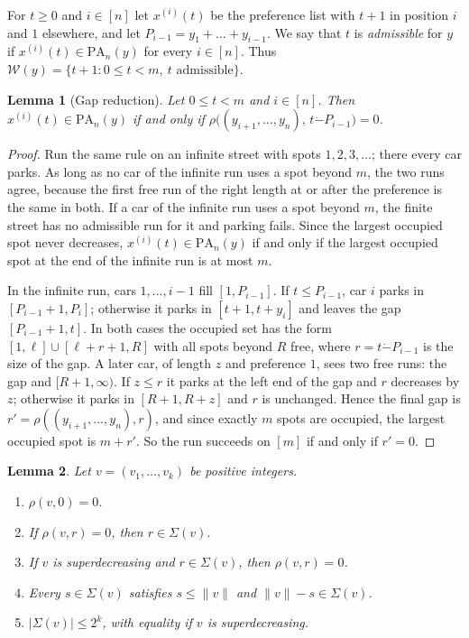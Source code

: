 \documentclass[11pt]{article}
\newtheorem{lemma}{Lemma}
\theoremstyle{remark}
\newcommand{\W}{\mathcal W}
\newcommand{\PA}{\mathrm{PA}}
\newcommand{\Sub}{\Sigma}
\newcommand{\monus}{\mathbin{\dot{-}}}
\begin{document}
For $t\ge0$ and $i\in[n]$ let $x^{(i)}(t)$ be the preference list with $t+1$
in position $i$ and $1$ elsewhere, and let $P_{i-1}=y_1+\dots+y_{i-1}$. We say
that $t$ is \emph{admissible} for $y$ if $x^{(i)}(t)\in\PA_n(y)$ for every
$i\in[n]$. Thus $\W(y)=\{t+1: 0\le t<m,\ t \text{ admissible}\}$.

\begin{lemma}[Gap reduction]\label{lem:gap}
Let $0\le t<m$ and $i\in[n]$. Then $x^{(i)}(t)\in\PA_n(y)$ if and only if
$\rho\bigl((y_{i+1},\dots,y_n),\,t\monus P_{i-1}\bigr)=0$.
\end{lemma}

\begin{proof}
Run the same rule on an infinite street with spots $1,2,3,\dots$; there every
car parks. As long as no car of the infinite run uses a spot beyond $m$, the
two runs agree, because the first free run of the right length at or after the
preference is the same in both. If a car of the infinite run uses a spot
beyond $m$, the finite street has no admissible run for it and parking fails.
Since the largest occupied spot never decreases, $x^{(i)}(t)\in\PA_n(y)$ if
and only if the largest occupied spot at the end of the infinite run is at
most $m$.

In the infinite run, cars $1,\dots,i-1$ fill $[1,P_{i-1}]$. If $t\le P_{i-1}$,
car $i$ parks in $[P_{i-1}+1,P_i]$; otherwise it parks in $[t+1,t+y_i]$ and
leaves the gap $[P_{i-1}+1,t]$. In both cases the occupied set has the form
$[1,\ell]\cup[\ell+r+1,R]$ with all spots beyond $R$ free, where
$r=t\monus P_{i-1}$ is the size of the gap. A later car, of length $z$ and
preference $1$, sees two free runs: the gap and $[R+1,\infty)$. If $z\le r$ it
parks at the left end of the gap and $r$ decreases by $z$; otherwise it parks
in $[R+1,R+z]$ and $r$ is unchanged. Hence the final gap is
$r'=\rho((y_{i+1},\dots,y_n),r)$, and since exactly $m$ spots are occupied, the
largest occupied spot is $m+r'$. So the run succeeds on $[m]$ if and only if
$r'=0$.
\end{proof}

\begin{lemma}\label{lem:rho}
Let $v=(v_1,\dots,v_k)$ be positive integers.
\begin{enumerate}
\item[(a)] $\rho(v,0)=0$.
\item[(b)] If $\rho(v,r)=0$, then $r\in\Sub(v)$.
\item[(c)] If $v$ is superdecreasing and $r\in\Sub(v)$, then $\rho(v,r)=0$.
\item[(d)] Every $s\in\Sub(v)$ satisfies $s\le\|v\|$ and $\|v\|-s\in\Sub(v)$.
\item[(e)] $|\Sub(v)|\le2^k$, with equality if $v$ is superdecreasing.
\end{enumerate}
\end{lemma}
\end{document}
